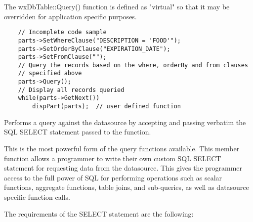 The wxDbTable::Query() function is defined as "virtual" so that it may be 
overridden for application specific purposes.



\begin{verbatim}
    // Incomplete code sample
    parts->SetWhereClause("DESCRIPTION = 'FOOD'");
    parts->SetOrderByClause("EXPIRATION_DATE");
    parts->SetFromClause("");
    // Query the records based on the where, orderBy and from clauses 
    // specified above
    parts->Query();
    // Display all records queried
    while(parts->GetNext())
        dispPart(parts);  // user defined function
\end{verbatim}


\label{wxdbtablequerybysqlstmt}


Performs a query against the datasource by accepting and passing verbatim the 
SQL SELECT statement passed to the function.




This is the most powerful form of the query functions available.  This member 
function allows a programmer to write their own custom SQL SELECT statement 
for requesting data from the datasource.  This gives the programmer access 
to the full power of SQL for performing operations such as scalar functions, 
aggregate functions, table joins, and sub-queries, as well as datasource 
specific function calls.  

The requirements of the SELECT statement are the following:

